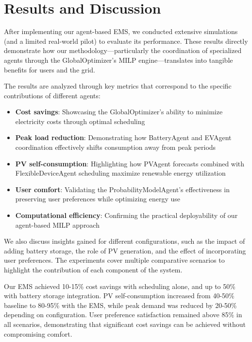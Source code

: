 \documentclass[12pt,a4paper]{article}
\begin{document}
\clearpage

\section{Results and Discussion}
After implementing our agent-based EMS, we conducted extensive simulations (and a limited real-world pilot) to evaluate its performance. These results directly demonstrate how our methodology—particularly the coordination of specialized agents through the GlobalOptimizer's MILP engine—translates into tangible benefits for users and the grid.

The results are analyzed through key metrics that correspond to the specific contributions of different agents:
\begin{itemize}
    \item \textbf{Cost savings}: Showcasing the GlobalOptimizer's ability to minimize electricity costs through optimal scheduling
    \item \textbf{Peak load reduction}: Demonstrating how BatteryAgent and EVAgent coordination effectively shifts consumption away from peak periods
    \item \textbf{PV self-consumption}: Highlighting how PVAgent forecasts combined with FlexibleDeviceAgent scheduling maximize renewable energy utilization
    \item \textbf{User comfort}: Validating the ProbabilityModelAgent's effectiveness in preserving user preferences while optimizing energy use
    \item \textbf{Computational efficiency}: Confirming the practical deployability of our agent-based MILP approach
\end{itemize}

We also discuss insights gained for different configurations, such as the impact of adding battery storage, the role of PV generation, and the effect of incorporating user preferences. The experiments cover multiple comparative scenarios to highlight the contribution of each component of the system.

\begin{tcolorbox}[colback=blue!5!white,colframe=blue!75!black,title=Key Results Summary]
Our EMS achieved 10-15\% cost savings with scheduling alone, and up to 50\% with battery storage integration. PV self-consumption increased from 40-50\% baseline to 80-95\% with the EMS, while peak demand was reduced by 20-50\% depending on configuration. User preference satisfaction remained above 85\% in all scenarios, demonstrating that significant cost savings can be achieved without compromising comfort.
\end{tcolorbox}
\end{document}

